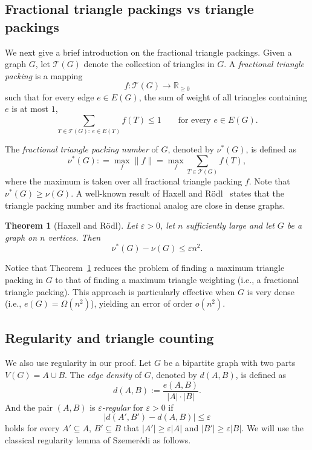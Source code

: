\documentclass[11pt,reqno]{amsart}
\newtheorem{theorem}{Theorem}[section]
\theoremstyle{definition}
\theoremstyle{remark}
\renewcommand\le{\leqslant}
\renewcommand\ge{\geqslant}
\renewcommand\to{\rightarrow}
\begin{document}
\medskip

\subsection{Fractional triangle packings vs triangle packings}

We next give a brief introduction on the fractional triangle packings. Given a graph $G$, let $\mathcal{T}(G)$ denote the collection of triangles in $G$. A \emph{fractional triangle packing} is a mapping
$$f : \mathcal{T}(G) \to \mathbb{R}_{\ge 0}$$
such that for every edge $e\in E(G)$, the sum of weight of all triangles containing $e$ is at most $1$, 
$$\sum_{T \in \mathcal{T}(G):\ e\in E(T)} f(T) \le 1
\qquad \text{for every } e \in E(G).$$


The \emph{fractional triangle packing number} of $G$, denoted by $\nu^*(G)$, is defined as
$$\nu^*(G): = \max_f \|f\| = \max_{f} \sum_{T \in \mathcal{T}(G)} f(T),$$
where the maximum is taken over all fractional
triangle packing $f$. Note that $\nu^*(G) \ge \nu(G)$. A well-known
result of Haxell and R\"odl~\cite{HR} states that the triangle packing number
and its fractional analog are close in dense graphs.

\begin{theorem}[Haxell and R\"odl]\label{thm:HR}
Let $\varepsilon > 0$, let $n$ sufficiently large and let $G$ be a graph on $n$ vertices. Then
$$\nu^*(G) - \nu(G) \le \varepsilon n^2.$$
\end{theorem}


Notice that Theorem~\ref{thm:HR} reduces the problem of finding a maximum triangle packing in $ G $ to that of finding a maximum triangle weighting (i.e., a fractional triangle packing). This approach is particularly effective when $ G $ is very dense (i.e., $ e(G) = \Omega(n^2) $), yielding an error of order $ o(n^2) $.



\medskip

\subsection{Regularity and triangle counting}
We also use regularity in our proof. Let $G$ be a bipartite graph with two parts $V(G)=A\cup B$. The \emph{edge density} of $G$, denoted by $d(A,B)$, is defined as 
$$d(A,B):=\frac{e(A,B)}{|A|\cdot |B|}.$$
And the pair $(A,B)$ is \emph{$\varepsilon$-regular} for $\varepsilon>0$ if
$$|d(A',B')-d(A,B)|\le \varepsilon$$
holds for every $A'\subseteq A$, $B'\subseteq B$ that $|A'|\ge \varepsilon |A|$ and $|B'|\ge \varepsilon |B|$.
We will use the classical regularity lemma of Szemerédi as follows.
\end{document}
